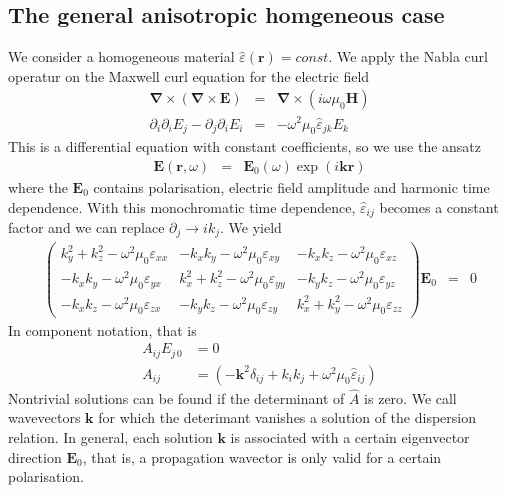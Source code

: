 \documentclass[12pt,a4paper,twoside,openright,BCOR10mm,headsepline,titlepage,abstracton,chapterprefix,final]{scrreprt}
\newcommand\Vector[1]{{\mathbf{#1}}}
\newcommand\vacuum{0}
\newcommand\Location{\Vector{r}}
\newcommand\wavenumber{k}
\newcommand\Wavevector{\Vector{\wavenumber}}
\newcommand\Nabla{\Vector{\nabla}}
\newcommand\Tensor[1]{\hat{#1}}
\newcommand\scalarEfield{E}
\newcommand\scalarHfield{H}
\newcommand\Efield{\Vector{\scalarEfield}}
\newcommand\Hfield{\Vector{\scalarHfield}}
\newcommand\vacuumpermeability{\scalarpermeability_{\vacuum}}
\newcommand\scalarpermeability{\mu}
\newcommand\permittivity{\Tensor{\scalarpermittivity}}
\newcommand\scalarpermittivity{\varepsilon}
\begin{document}
\subsection{The general anisotropic homgeneous case}
We consider a homogeneous material $\permittivity(\Location) = const.$ We apply the Nabla curl operatur on the Maxwell curl equation for the electric field
\begin{eqnarray}
  \Nabla \times ( \Nabla \times \Efield ) &=& \Nabla \times ( i \omega \vacuumpermeability \Hfield ) 
  \\
  \partial_i \partial_i \scalarEfield_j - \partial_j \partial_i \scalarEfield_i &=& - \omega^2 \vacuumpermeability \permittivity_{jk} \scalarEfield_{k}
\end{eqnarray}
This is a differential equation with constant coefficients, so we use the ansatz
\begin{eqnarray}
 \Efield(\Location,\omega) &=& \Efield_0(\omega) \exp(i \Wavevector \Location)
\end{eqnarray}
where the $\Efield_0$ contains polarisation, electric field amplitude and harmonic time dependence.
With this monochromatic time dependence, $\permittivity_{ij}$ becomes a constant factor 
and we can replace $\partial_j \to i k_j$. We yield
\begin{eqnarray}
\begin{pmatrix}
 \wavenumber_y^2 + \wavenumber_z^2 - \omega^2 \vacuumpermeability \scalarpermittivity_{xx} 
 &
 - \wavenumber_x \wavenumber_y - \omega^2 \vacuumpermeability \scalarpermittivity_{xy}
 &
 - \wavenumber_x \wavenumber_z - \omega^2 \vacuumpermeability \scalarpermittivity_{xz}
 \\
 - \wavenumber_x \wavenumber_y - \omega^2 \vacuumpermeability \scalarpermittivity_{yx}
 &
 \wavenumber_x^2 + \wavenumber_z^2 - \omega^2 \vacuumpermeability \scalarpermittivity_{yy} 
 &
 - \wavenumber_y \wavenumber_z - \omega^2 \vacuumpermeability \scalarpermittivity_{yz}
 \\
 - \wavenumber_x \wavenumber_z - \omega^2 \vacuumpermeability \scalarpermittivity_{zx}
 &
 - \wavenumber_y \wavenumber_z - \omega^2 \vacuumpermeability \scalarpermittivity_{zy}
 &
 \wavenumber_x^2 + \wavenumber_y^2 - \omega^2 \vacuumpermeability \scalarpermittivity_{zz}  
\end{pmatrix}
\Efield_0
&=& 0 \label{eq:generalDispersionEigenEquation}
\end{eqnarray}
In component notation, that is
\begin{align}
 A_{ij} E_{j\,0} &= 0 \label{eq:generalDispersionEigenEquationindex}\\
 A_{ij}          &= \left(-\Vector{k}^2 \delta_{ij} + k_i k_j + \omega^2 \vacuumpermeability \permittivity_{ij} \right)
 \end{align}
Nontrivial solutions can be found if the determinant of $\hat{A}$ is zero.
We call wavevectors $\Wavevector$ for which the deterimant vanishes a solution of the dispersion relation.
In general, each solution $\Wavevector$ is associated with a certain eigenvector direction $\Efield_0$,
that is, a propagation wavector is only valid for a certain polarisation.
\end{document}
